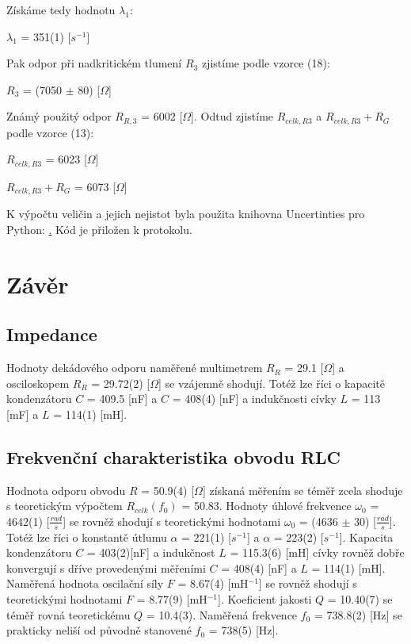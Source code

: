 \documentclass[a4paper,11pt]{article}
\begin{document}
\begin{minipage}[t]{0.5\textwidth} 
                Získáme tedy hodnotu $\lambda_1$:
                \begin{center}
                    $\lambda_1$ = 351(1) [$s^{-1}$]
                \end{center}
                Pak odpor při nadkritickém tlumení $R_3$ zjistíme podle vzorce (18):
                \begin{center}
                    $R_3$ = (7050 $\pm$ 80) [$\Omega$]
                \end{center}
                Známý použitý odpor $R_{R,3}$ = 6002 [$\Omega$]. Odtud zjistíme $R_{celk, R3}$ a $R_{celk, R3} + R_G$ podle vzorce (13):
                \begin{center}
                    $R_{celk, R3}$ = 6023 [$\Omega$]
                    \vspace{5pt}
                    \par $R_{celk, R3} + R_G$ = 6073 [$\Omega$]
                \end{center}
                K výpočtu veličin a jejich nejistot byla použita knihovna Uncertinties pro Python: \href{pypi.org/project/uncertainties}. Kód je přiložen k protokolu. 
        \section{Závěr}  
            \subsection{Impedance}
                Hodnoty dekádového odporu naměřené multimetrem $R_R$ = 29.1 [$\Omega$] a osciloskopem $R_R$ = 29.72(2) [$\Omega$] se vzájemně shodují. Totéž lze říci o kapacitě kondenzátoru $C$ = 409.5 [nF] a $C$ = 408(4) [nF] a indukčnosti cívky $L$ = 113 [mF] a $L$ = 114(1) [mH].
            \subsection{Frekvenční charakteristika obvodu RLC}
                Hodnota odporu obvodu $R$ = 50.9(4) [$\Omega$] získaná měřením se téměř zcela shoduje s teoretickým výpočtem $R_{celk}(f_0)$ = 50.83. Hodnoty úhlové frekvence $\omega_0$ = 4642(1) [$\frac{rad}{s}$] se rovněž shodují s teoretickými hodnotami $\omega_0$ = (4636 $\pm$ 30) [$\frac{rad}{s}$]. Totéž lze říci o konstantě útlumu $\alpha$ = 221(1) [$s^{-1}$] a $\alpha$ = 223(2) [$s^{-1}$]. Kapacita kondenzátoru $C$ = 403(2)[nF] a indukčnost $L$ = 115.3(6) [mH] cívky rovněž dobře konvergují s dříve provedenými měřeními $C$ = 408(4) [nF] a $L$ = 114(1) [mH]. Naměřená hodnota oscilační síly $F$ = 8.67(4) [mH$^{-1}$] se rovněž shodují s teoretickými hodnotami $F$ = 8.77(9) [mH$^{-1}$]. Koeficient jakosti $Q$ = 10.40(7) se téměř rovná teoretickému $Q$ = 10.4(3). Naměřená frekvence $f_0$ = 738.8(2) [Hz] se prakticky neliší od původně stanovené $f_0$ = 738(5) [Hz].
\end{minipage}
\end{document}
